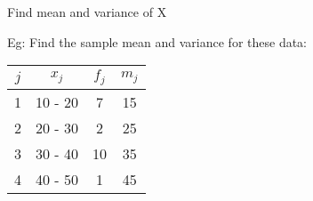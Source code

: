 Find mean and variance of X


Eg: Find the sample mean and variance for these data:
\begin{table}[H]
    \centering
    \begin{tabular}{|c|c|c|c|}
        \hline $j$ & $x_j$   & $f_j$ & $m_j$ \\
        \hline 1   & 10 - 20 & 7     & 15    \\
        \hline 2   & 20 - 30 & 2     & 25    \\
        \hline 3   & 30 - 40 & 10    & 35    \\
        \hline 4   & 40 - 50 & 1     & 45    \\
        \hline
    \end{tabular}
\end{table}

